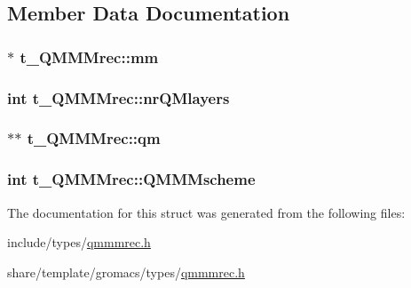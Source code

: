 \subsection{\-Member \-Data \-Documentation}
\hypertarget{structt__QMMMrec_a31dc1d1e891c048946eb47ff27f05aef}{
\subsubsection[{mm}]{ $\ast$ {\bf t\-\_\-\-Q\-M\-M\-Mrec\-::mm}}}\label{structt__QMMMrec_a31dc1d1e891c048946eb47ff27f05aef}
\hypertarget{structt__QMMMrec_a2dd95e630a6ba85a5a56abf317f68b42}{
\subsubsection[{nr\-Q\-Mlayers}]{\setlength{\rightskip}{0pt plus 5cm}int {\bf t\-\_\-\-Q\-M\-M\-Mrec\-::nr\-Q\-Mlayers}}}\label{structt__QMMMrec_a2dd95e630a6ba85a5a56abf317f68b42}
\hypertarget{structt__QMMMrec_a0398b50578ef1103ef070bbbf89a817c}{
\subsubsection[{qm}]{ $\ast$$\ast$ {\bf t\-\_\-\-Q\-M\-M\-Mrec\-::qm}}}\label{structt__QMMMrec_a0398b50578ef1103ef070bbbf89a817c}
\hypertarget{structt__QMMMrec_a83cc5d05c3e19488416e2f41479449c5}{
\subsubsection[{\-Q\-M\-M\-Mscheme}]{\setlength{\rightskip}{0pt plus 5cm}int {\bf t\-\_\-\-Q\-M\-M\-Mrec\-::\-Q\-M\-M\-Mscheme}}}\label{structt__QMMMrec_a83cc5d05c3e19488416e2f41479449c5}


\-The documentation for this struct was generated from the following files\-:\begin{DoxyCompactItemize}
\item 
include/types/\hyperlink{include_2types_2qmmmrec_8h}{qmmmrec.\-h}\item 
share/template/gromacs/types/\hyperlink{share_2template_2gromacs_2types_2qmmmrec_8h}{qmmmrec.\-h}\end{DoxyCompactItemize}
